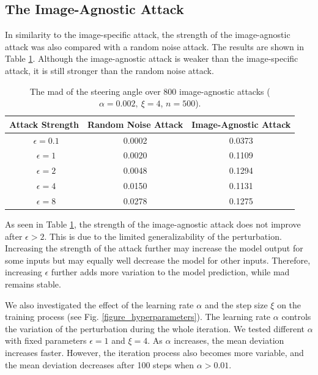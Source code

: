 \vfill

\subsection{The Image-Agnostic Attack}

In similarity to the image-specific attack, the strength of the image-agnostic attack was also compared with a random noise attack.
The results are shown in Table \ref{tab:image-agnostic}. Although the image-agnostic attack is weaker than the image-specific attack, it is still stronger than the random noise attack.

\begin{table}[H]
    \centering
    \begin{tabular}{ccc}
    \hline
    Attack Strength & Random Noise Attack & Image-Agnostic Attack\\
    \hline
    \ $\epsilon=0.1$    & 0.0002    & 0.0373 \\
    \ $\epsilon=1$      & 0.0020    & 0.1109 \\
    \ $\epsilon=2$      & 0.0048    & 0.1294 \\
    \ $\epsilon=4$      & 0.0150    & 0.1131 \\
    \ $\epsilon=8$      & 0.0278    & 0.1275 \\
    \hline
    \end{tabular}
    \caption{The \acrfull{mad} of the steering angle over 800 image-agnostic attacks ($\alpha=0.002,\ \xi=4$, $n=500$).}
    \label{tab:image-agnostic}
\end{table}





As seen in Table \ref{tab:image-agnostic}, the strength of the image-agnostic attack does not improve after $\epsilon > 2$. This is due to the limited generalizability of the perturbation. Increasing the strength of the attack further may increase the model output for some inputs but may equally well decrease the model for other inputs. Therefore, increasing $\epsilon$ further adds more variation to the model prediction, while \acrshort{mad} remains stable.

We also investigated the effect of the learning rate $\alpha$ and the step size $\xi$ on the training process (see Fig. \ref{figure_hyperparameters}). The learning rate $\alpha$ controls the variation of the perturbation during the whole iteration. We tested different $\alpha$ with fixed parameters $\epsilon=1$ and $\xi=4$. As $\alpha$ increases, the mean deviation increases faster. However, the iteration process also becomes more variable, and the mean deviation decreases after 100 steps when $\alpha>0.01$. 

